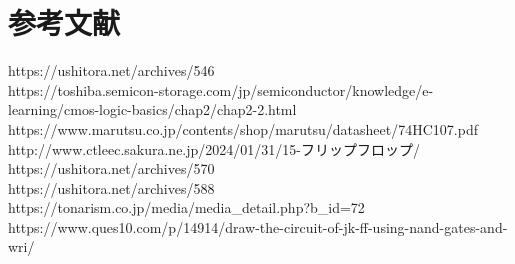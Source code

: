 \documentclass{jlreq}
\numberwithin{equation}{section}
\begin{document}
\section{参考文献}
https://ushitora.net/archives/546 \\
https://toshiba.semicon-storage.com/jp/semiconductor/knowledge/e-learning/cmos-logic-basics/chap2/chap2-2.html \\
https://www.marutsu.co.jp/contents/shop/marutsu/datasheet/74HC107.pdf \\
http://www.ctleec.sakura.ne.jp/2024/01/31/15-フリップフロップ/ \\
https://ushitora.net/archives/570 \\
https://ushitora.net/archives/588 \\
https://tonarism.co.jp/media/media\_detail.php?b\_id=72 \\
https://www.ques10.com/p/14914/draw-the-circuit-of-jk-ff-using-nand-gates-and-wri/ \\
\end{document}
